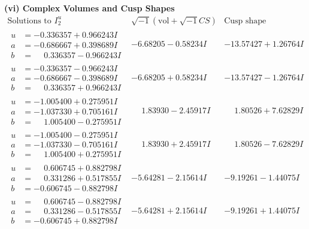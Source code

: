 \documentclass[1p]{elsarticle_modified}
\theoremstyle{definition}
\newcommand{\I}{\sqrt{-1}}
\begin{document}
\newpage\flushleft \textbf{(vi) Complex Volumes and Cusp Shapes}
$$\begin{array}{c|c|c}  
\text{Solutions to }I^u_{2}& \I (\text{vol} + \sqrt{-1}CS) & \text{Cusp shape}\\
 \hline 
\begin{aligned}
u &= -0.336357 + 0.966243 I \\
a &= -0.686667 + 0.398689 I \\
b &= \phantom{-}0.336357 - 0.966243 I\end{aligned}
 & -6.68205 - 0.58234 I & -13.57427 + 1.26764 I \\ \hline\begin{aligned}
u &= -0.336357 - 0.966243 I \\
a &= -0.686667 - 0.398689 I \\
b &= \phantom{-}0.336357 + 0.966243 I\end{aligned}
 & -6.68205 + 0.58234 I & -13.57427 - 1.26764 I \\ \hline\begin{aligned}
u &= -1.005400 + 0.275951 I \\
a &= -1.037330 + 0.705161 I \\
b &= \phantom{-}1.005400 - 0.275951 I\end{aligned}
 & \phantom{-}1.83930 - 2.45917 I & \phantom{-}1.80526 + 7.62829 I \\ \hline\begin{aligned}
u &= -1.005400 - 0.275951 I \\
a &= -1.037330 - 0.705161 I \\
b &= \phantom{-}1.005400 + 0.275951 I\end{aligned}
 & \phantom{-}1.83930 + 2.45917 I & \phantom{-}1.80526 - 7.62829 I \\ \hline\begin{aligned}
u &= \phantom{-}0.606745 + 0.882798 I \\
a &= \phantom{-}0.331286 + 0.517855 I \\
b &= -0.606745 - 0.882798 I\end{aligned}
 & -5.64281 - 2.15614 I & -9.19261 - 1.44075 I \\ \hline\begin{aligned}
u &= \phantom{-}0.606745 - 0.882798 I \\
a &= \phantom{-}0.331286 - 0.517855 I \\
b &= -0.606745 + 0.882798 I\end{aligned}
 & -5.64281 + 2.15614 I & -9.19261 + 1.44075 I \\ \hline\begin{aligned}

\end{aligned}
\end{array}$$
\end{document}
